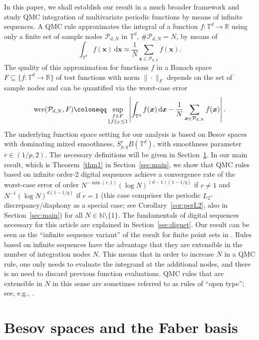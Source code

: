 \documentclass[12pt, a4paper]{article}
\newcommand{\wce}{{\rm wce}}
\newcommand{\bsx}{{\boldsymbol{x}}}
\newcommand{\NN}{{\mathbb{N}}} %
\newcommand{\calP}{{\mathcal{P}}}
\newcommand{\bbR}{{\mathbb{R}}}
\begin{document}
In this paper, we shall establish our result in a much broader framework and study QMC integration of multivariate periodic functions by means of infinite sequences. A QMC rule approximates the integral of a function $f: \mathbb T^d \rightarrow \mathbb R$ using only a finite set of sample nodes $\calP_{d, N}$ in $\mathbb T^d$, $\#\calP_{d, N} = N$, by means of
$$
\int_{\mathbb T^d} f(\bsx) \, \mathrm d\bsx \approx \frac1N \sum_{\bsx \in \calP_{d, N}} f(\bsx).
$$
The quality of this approximation for functions $f$ in a Banach space $F \subseteq \{f: \mathbb T^d \rightarrow \bbR\}$ of test functions with norm $\|\cdot\|_F$ depends on the set of sample nodes and can be quantified via the worst-case error
$$
\wce(\calP_{d, N}, F) \coloneqq \sup_{\substack{f \in F \\ \|f\|_F \leq 1}} \left|\int_{\mathbb T^d} f(\bsx) \, \mathrm d\bsx - \frac1N \sum_{\bsx \in \calP_{d, N}} f(\bsx)\right|.
$$
The underlying function space setting for our analysis is based on Besov spaces with dominating mixed smoothness, $S_{p,q}^rB(\mathbb{T}^d)$, with smoothness parameter $r \in (1/p,2)$. The necessary definitions will be given in Section~\ref{sec:besov}. In our main result, which is Theorem~\ref{thm1} in Section~\ref{sec:main}, we show that QMC rules based on infinite order-2 digital sequences achieve a convergence rate of the worst-case error of order $N^{-\min(r,1)} (\log N)^{(d-1)(1-1/q)}$ if $r \not=1$ and $N^{-1} (\log N)^{d(1-1/q)}$ if $r=1$ (this case comprises the periodic $L_2$-discrepancy/diaphony as a special case;  see Corollary~\ref{cor:perL2}, also in Section~\ref{sec:main}) for all $N \in \NN\setminus\{1\}$. The fundamentals of digital sequences necessary for this article are explained in Section~\ref{sec:dignet}. Our result can be seen as the ``infinite sequence variant'' of the result for finite point sets in \cite{HMOU}. Rules based on infinite sequences have the advantage that they are extensible in the number of integration nodes $N$. This means that in order to increase $N$ in a QMC rule, one only needs to evaluate the integrand at the additional nodes, and there is no need to discard previous function evaluations. QMC rules that are extensible in $N$ in this sense are sometimes referred to as rules of ``open type''; see, e.g., \cite[Section~2.3]{DKS}.

\section{Besov spaces and the Faber basis}\label{sec:besov}
\end{document}
